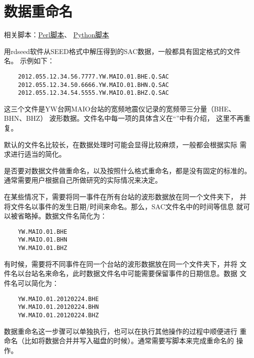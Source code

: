 \section{数据重命名}
相关脚本：\hyperref[subsec:rename-in-perl]{Perl脚本}、
          \hyperref[subsec:rename-in-python]{Python脚本}

用rdseed软件从SEED格式中解压得到的SAC数据，一般都具有固定格式的文件名。
示例如下：
\begin{verbatim}
    2012.055.12.34.56.7777.YW.MAIO.01.BHE.Q.SAC
    2012.055.12.34.50.6666.YW.MAIO.01.BHN.Q.SAC
    2012.055.12.34.54.5555.YW.MAIO.01.BHZ.Q.SAC
\end{verbatim}
这三个文件是YW台网MAIO台站的宽频地震仪记录的宽频带三分量（BHE、BHN、BHZ）
波形数据。文件名中每一项的具体含义在``''中有介绍，
这里不再重复。

默认的文件名比较长，在数据处理时可能会显得比较麻烦，一般都会根据实际
需求进行适当的简化。

是否要对数据文件做重命名，以及按照什么格式重命名，都是没有固定的标准的。
通常需要用户根据自己所做研究的实际情况来决定。

在某些情况下，需要将同一事件在所有台站的波形数据放在同一个文件夹下，
并将文件名以事件的发生日期/时间来命名。那么，SAC文件名中的时间等信息
就可以被省略掉。数据文件名简化为：
\begin{verbatim}
    YW.MAIO.01.BHE
    YW.MAIO.01.BHN
    YW.MAIO.01.BHZ
\end{verbatim}

有时候，需要将不同事件在同一个台站的波形数据放在同一个文件夹下，并将
文件名以台站名来命名，此时数据文件名中可能需要保留事件的日期信息。数据
文件名可以简化为：
\begin{verbatim}
    YW.MAIO.01.20120224.BHE
    YW.MAIO.01.20120224.BHN
    YW.MAIO.01.20120224.BHZ
\end{verbatim}

数据重命名这一步骤可以单独执行，也可以在执行其他操作的过程中顺便进行
重命名（比如将数据合并并写入磁盘的时候）。通常需要写脚本来完成重命名的
操作。
